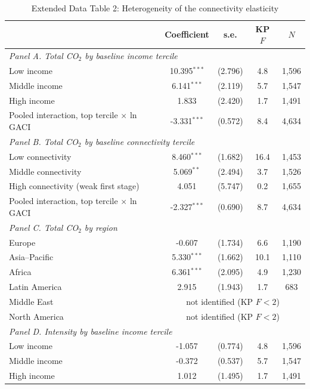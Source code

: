 \documentclass[12pt]{article}
\begin{document}
\begin{table}[htbp]
\centering
\begin{threeparttable}
\caption{Extended Data Table 2: Heterogeneity of the connectivity elasticity}
\label{tab:hetero}
\footnotesize
\begin{tabular}{lcccc}
\toprule
 & Coefficient & s.e. & KP $F$ & $N$ \\
\midrule
\multicolumn{5}{l}{\textit{Panel A. Total CO$_2$ by baseline income tercile}} \\
  Low income & 10.395$^{***}$ & (2.796) & 4.8 & 1,596 \\
  Middle income & 6.141$^{***}$ & (2.119) & 5.7 & 1,547 \\
  High income & 1.833 & (2.420) & 1.7 & 1,491 \\
  \quad Pooled interaction, top tercile $\times$ ln GACI & -3.331$^{***}$ & (0.572) & 8.4 & 4,634 \\
\midrule
\multicolumn{5}{l}{\textit{Panel B. Total CO$_2$ by baseline connectivity tercile}} \\
  Low connectivity & 8.460$^{***}$ & (1.682) & 16.4 & 1,453 \\
  Middle connectivity & 5.069$^{**}$ & (2.494) & 3.7 & 1,526 \\
  High connectivity (weak first stage) & 4.051 & (5.747) & 0.2 & 1,655 \\
  \quad Pooled interaction, top tercile $\times$ ln GACI & -2.327$^{***}$ & (0.690) & 8.7 & 4,634 \\
\midrule
\multicolumn{5}{l}{\textit{Panel C. Total CO$_2$ by region}} \\
  Europe & -0.607 & (1.734) & 6.6 & 1,190 \\
  Asia--Pacific & 5.330$^{***}$ & (1.662) & 10.1 & 1,110 \\
  Africa & 6.361$^{***}$ & (2.095) & 4.9 & 1,230 \\
  Latin America & 2.915 & (1.943) & 1.7 & 683 \\
  Middle East & \multicolumn{4}{c}{not identified (KP $F<2$)} \\
  North America & \multicolumn{4}{c}{not identified (KP $F<2$)} \\
\midrule
\multicolumn{5}{l}{\textit{Panel D. Intensity by baseline income tercile}} \\
  Low income & -1.057 & (0.774) & 4.8 & 1,596 \\
  Middle income & -0.372 & (0.537) & 5.7 & 1,547 \\
  High income & 1.012 & (1.495) & 1.7 & 1,491 \\

\end{tabular}
\end{threeparttable}
\end{table}
\end{document}
